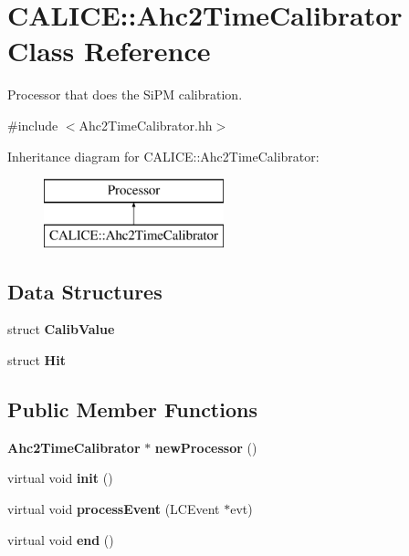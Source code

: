 \section{C\-A\-L\-I\-C\-E\-:\-:Ahc2\-Time\-Calibrator Class Reference}
\label{classCALICE_1_1Ahc2TimeCalibrator}


Processor that does the Si\-P\-M calibration.  




{\ttfamily \#include $<$Ahc2\-Time\-Calibrator.\-hh$>$}

Inheritance diagram for C\-A\-L\-I\-C\-E\-:\-:Ahc2\-Time\-Calibrator\-:\begin{figure}[H]
\begin{center}
\leavevmode
\includegraphics[height=2.000000cm]{classCALICE_1_1Ahc2TimeCalibrator}
\end{center}
\end{figure}
\subsection*{Data Structures}
\begin{DoxyCompactItemize}
\item 
struct {\bf Calib\-Value}
\item 
struct {\bf Hit}
\end{DoxyCompactItemize}
\subsection*{Public Member Functions}
\begin{DoxyCompactItemize}
\item 
{\bf Ahc2\-Time\-Calibrator} $\ast$ {\bfseries new\-Processor} ()\label{classCALICE_1_1Ahc2TimeCalibrator_a62fcfe64c82ded7d6b18a097eac0e227}

\item 
virtual void {\bfseries init} ()\label{classCALICE_1_1Ahc2TimeCalibrator_a1fd9c70b3c5e877cf9453576cdd9fc7f}

\item 
virtual void {\bfseries process\-Event} (L\-C\-Event $\ast$evt)\label{classCALICE_1_1Ahc2TimeCalibrator_a9e46000ab9e97cbf91ed0b5227fecbd1}

\item 
virtual void {\bfseries end} ()\label{classCALICE_1_1Ahc2TimeCalibrator_a2c604dd3e54a64f208d81bfb9fce8677}

\end{DoxyCompactItemize}
